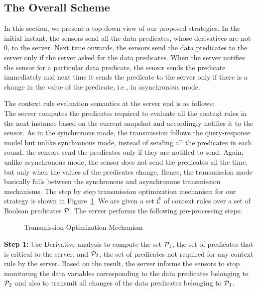 \subsection{The Overall Scheme} \label{sec5}
\noindent
In this section, we present a top-down view of our proposed strategies. 
In the initial instant, the sensors send all the data predicates, whose derivatives are not 0, to the server.
Next time onwards, the sensors send the data predicates to the server only if the server asked for the data predicates.
When the server notifies the sensor for a particular data predicate, the sensor sends the predicate immediately and 
next time it sends the predicate to the server only if there is a 
change in the value of the predicate, i.e., in 
asynchronous mode. 

\noindent
The context rule evaluation semantics at the server end is as follows: \\
The server computes the predicates required to evaluate all 
the context rules in the next instance based on the current snapshot and accordingly notifies it to the sensor. 
As in the synchronous mode, the transmission follows the query-response model but unlike synchronous mode, instead of sending 
all the predicates in each round, the sensors send the predicates only if they are notified to send. 
Again, unlike asynchronous mode, the sensor does not send the predicates all the time, but only when the values of the 
predicates change. Hence, the transmission mode basically falls between the synchronous and asynchronous transmission 
mechanisms.
The step by step transmission optimization mechanism for our strategy is shown in Figure~\ref{flow_chart}.
We are given a set $\hat{{\cal{C}}}$ of context rules over a set of Boolean predicates ${\cal{P}}$. 
The server performs the following pre-processing steps:

\begin{figure}%
\begin{center}
\caption{Transmission Optimization Mechanism}
\label{flow_chart}
\end{center}
\end{figure}


\vspace{2 mm}

\noindent
 {\bf{Step 1:}} Use Derivative analysis to compute the set 
 ${\cal{P}}_1$, the set of predicates that is critical to the server, and 
 ${\cal{P}}_2$, the set of predicates not required for any context rule by the server.
 Based on the result, the server informs the sensors to stop monitoring the data variables 
 corresponding to the data predicates belonging to ${\cal{P}}_2$ and also to transmit all 
 changes of the data predicates belonging to ${\cal{P}}_1$. 
 
